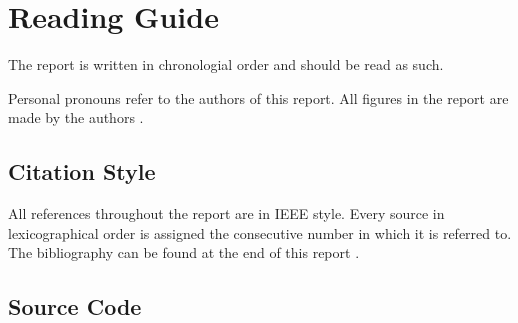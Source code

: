 \chapter*{Reading Guide}
The report is written in chronologial order and should be read as such. 

Personal pronouns refer to the authors of this report. All figures in the report are made by the authors .

\section*{Citation Style}
All references throughout the report are in IEEE style. Every source in lexicographical order is assigned the consecutive number in which it is referred to. The bibliography can be found at the end of this report .

\section*{Source Code}
